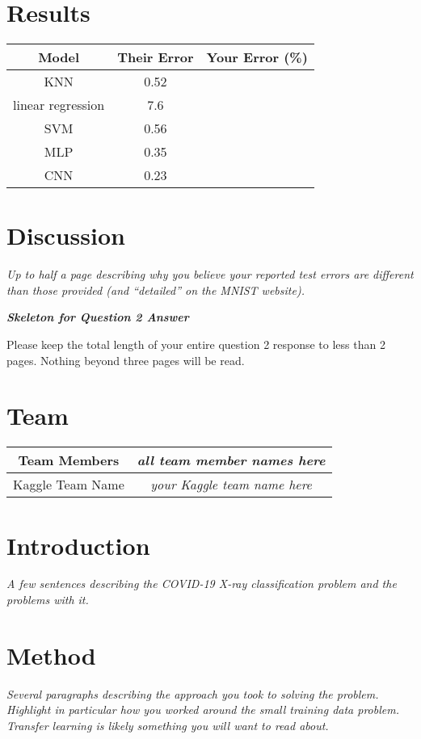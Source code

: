 \documentclass{article}
\begin{document}
\section{Results}
\begin{center}
 \begin{tabular}{|c | c | c|} 
 \hline
 Model & Their Error & Your Error (\%) \\ [0.5ex]
 \hline\hline
 KNN & 0.52 & \\
 linear regression & 7.6 & \\
 SVM & 0.56 & \\
 MLP & 0.35 & \\
 CNN & 0.23 & \\ 
 \hline
\end{tabular}
\end{center}

\section{Discussion}
\emph{Up to half a page describing why you believe your reported test errors are different than those provided (and ``detailed'' on the MNIST website).}

\newpage

{\em \bf Skeleton for Question 2 Answer}
\setcounter{section}{0}

Please keep the total length of your entire question 2 response to less than 2 pages.  Nothing beyond three pages will be read. 
\section{Team}
\begin{tabular}{|c | c } 
\hline
Team Members & \emph{all team member names here} \\
\hline
Kaggle Team Name & \emph{your Kaggle team name here}\\
\hline
\end{tabular}
\section{Introduction}
\emph{A few sentences describing the COVID-19 X-ray classification problem and the problems with it.}
\section{Method}
\emph{Several paragraphs describing the approach you took to solving the problem.  Highlight in particular how you worked around the small training
data problem.  Transfer learning is likely something you will want to read
about.}
\end{document}
